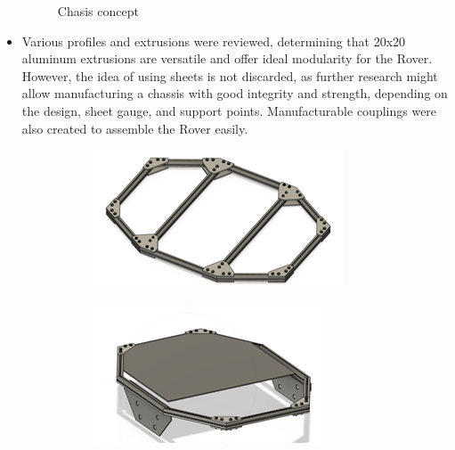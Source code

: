 \documentclass{article}
\begin{document}
\begin{itemize}
\begin{figure}[H]
\begin{subfigure}{.5\textwidth}
        \end{subfigure}
       
        \caption{Chasis concept}
    \end{figure}

    \item Various profiles and extrusions were reviewed, determining that 20x20 aluminum extrusions are versatile and offer ideal modularity for the Rover. However, the idea of using sheets is not discarded, as further research might allow manufacturing a chassis with good integrity and strength, depending on the design, sheet gauge, and support points. Manufacturable couplings were also created to assemble the Rover easily.
    \begin{figure}[H]
        \centering
        \begin{subfigure}{.3\textwidth}
          \centering
          \includegraphics[width=.9\linewidth]{Images/Chasis/Extrusions1.png}

          
        \end{subfigure}%
        \begin{subfigure}{.3\textwidth}
          \centering
          \includegraphics[width=.9\linewidth]{Images/Chasis/Extrusions2.png}


\end{subfigure}
\end{figure}
\end{itemize}
\end{document}
